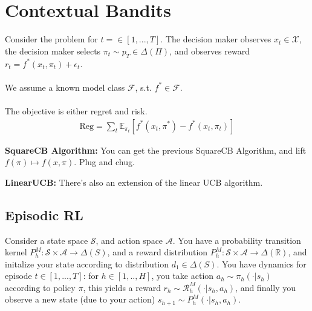 \section{Contextual Bandits}
Consider the problem for $t = \in[1,...,T]$. The decision maker observes $x_t \in \mathcal X$, the decision maker selects $\pi_t \sim p_T \in \Delta(\Pi)$, and observes reward $r_t  = f^*(x_t, \pi_t) + \epsilon_t$.\\
\\
We assume a known model class $\mathcal F$, s.t. $f^* \in \mathcal F$. \\
\\
The objective is either regret and risk.
\begin{align}
	\text{Reg} = \sum_t \mathbb E_{\pi_t} [f^*(x_t, \pi^*) - f^*(x_t, \pi_t)]
\end{align}
\begin{sidework}
	\textbf{SquareCB Algorithm:} You can get the previous SquareCB Algorithm, and lift $f(\pi) \mapsto f(x,\pi)$. Plug and chug.
\end{sidework}
\begin{sidework}
	\textbf{LinearUCB:} There's also an extension of the linear UCB algorithm.
\end{sidework}

\subsection{Episodic RL}
Consider a state space $\mathcal S$, and action space $\mathcal A$. You have a probability transition kernel $P_h^M : \mathcal S \times \mathcal A\to \Delta(S)$, and a reward distribution $P_h^M: \mathcal S \times \mathcal A \to \Delta(\mathbb R)$, and initalize your state according to distribution $d_1 \in \Delta(S)$. You have dynamics for episode $t \in [1,...,T]$: for $h \in [1,..,H]$, you take action $a_h \sim \pi_h(\cdot | s_h)$ according to policy $\pi$, this yields a reward $r_h \sim \mathcal R_h^M(\cdot | s_h, a_h)$, and finally you observe a new state (due to your action) $s_{h+1} \sim P_h^M(\cdot | s_h , a_h)$.

































